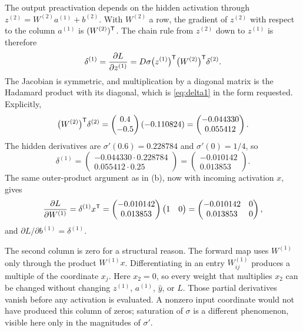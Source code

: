 The output preactivation depends on the hidden activation through \(z^{(2)} = W^{(2)} a^{(1)} + b^{(2)}\). With \(W^{(2)}\) a row, the gradient of \(z^{(2)}\) with respect to the column \(a^{(1)}\) is \((W^{(2)})^{\mathsf{T}}\). The chain rule from \(z^{(2)}\) down to \(z^{(1)}\) is therefore
\begin{equation}
  \delta^{(1)}
  =
  \frac{\partial L}{\partial z^{(1)}}
  =
  D\sigma\bigl(z^{(1)}\bigr)^{\mathsf{T}}
  \bigl(W^{(2)}\bigr)^{\mathsf{T}}
  \delta^{(2)}.
  \label{eq:delta1}
\end{equation}
The Jacobian is symmetric, and multiplication by a diagonal matrix is the Hadamard product with its diagonal, which is \eqref{eq:delta1} in the form requested. Explicitly,
\[
  \bigl(W^{(2)}\bigr)^{\mathsf{T}}\delta^{(2)}
  =
  \begin{pmatrix} 0.4 \\ -0.5 \end{pmatrix}(-0.110824)
  =
  \begin{pmatrix} -0.044330 \\ 0.055412 \end{pmatrix}.
\]
The hidden derivatives are \(\sigma'(0.6) = 0.228784\) and \(\sigma'(0) = 1/4\), so
\[
  \delta^{(1)}
  =
  \begin{pmatrix} -0.044330\cdot 0.228784 \\ 0.055412\cdot 0.25 \end{pmatrix}
  =
  \begin{pmatrix} -0.010142 \\ 0.013853 \end{pmatrix}.
\]
The same outer-product argument as in (b), now with incoming activation \(x\), gives
\[
  \frac{\partial L}{\partial W^{(1)}}
  =
  \delta^{(1)} x^{\mathsf{T}}
  =
  \begin{pmatrix} -0.010142 \\ 0.013853 \end{pmatrix}
  \begin{pmatrix} 1 & 0 \end{pmatrix}
  =
  \begin{pmatrix}
    -0.010142 & 0 \\
    0.013853 & 0
  \end{pmatrix},
\]
and \(\partial L/\partial b^{(1)} = \delta^{(1)}\).

The second column is zero for a structural reason. The forward map uses \(W^{(1)}\) only through the product \(W^{(1)}x\). Differentiating in an entry \(W^{(1)}_{ij}\) produces a multiple of the coordinate \(x_j\). Here \(x_2 = 0\), so every weight that multiplies \(x_2\) can be changed without changing \(z^{(1)}\), \(a^{(1)}\), \(\hat y\), or \(L\). Those partial derivatives vanish before any activation is evaluated. A nonzero input coordinate would not have produced this column of zeros; saturation of \(\sigma\) is a different phenomenon, visible here only in the magnitudes of \(\sigma'\).

